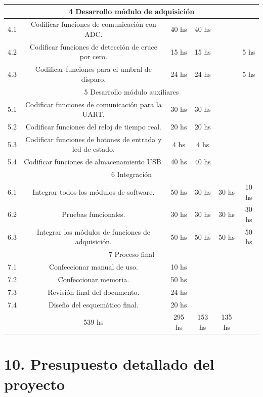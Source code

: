 \documentclass[11pt]{charter}
\begin{document}
\begin{table}[H]
{\begin{tabular}{|c|c|c|c|c|c|}
\multicolumn{6}{|c|}{\cellcolor[HTML]{FFCCCC}4 Desarrollo módulo de adquisición} \\ \hline
4.1 & Codificar funciones de comunicación con ADC. & 40 hs & 40 hs &  &    \\ \hline
4.2 & Codificar funciones de detección de cruce por cero. & 15 hs & 15 hs &  & 5 hs   \\ \hline
4.3 & Codificar funciones para el umbral de disparo. & 24 hs & 24 hs &  &  5 hs  \\ \hline
\multicolumn{6}{|c|}{\cellcolor[HTML]{FFFF99}5 Desarrollo módulo auxiliares} \\ \hline
5.1 & Codificar funciones de comunicación para la UART. & 30 hs & 30 hs &  &    \\ \hline
5.2 & Codificar funciones del reloj de tiempo real. & 20 hs & 20 hs &  &    \\ \hline
5.3 & Codificar funciones de botones de entrada y led de estado. & 4 hs & 4 hs &  &    \\ \hline
5.4 & Codificar funciones de almacenamiento USB. & 40 hs & 40 hs &  &    \\ \hline
\multicolumn{6}{|c|}{\cellcolor[HTML]{B9E0A5}6 Integración} \\ \hline
6.1 & Integrar todos los módulos de software. & 50 hs & 30 hs & 30 hs & 10 hs   \\ \hline
6.2 & Pruebas funcionales. & 30 hs & 30 hs & 30 hs & 30 hs   \\ \hline
6.3 & Integrar los módulos de funciones de adquisición. & 50 hs & 50 hs & 50 hs & 50 hs  \\ \hline
\multicolumn{6}{|c|}{\cellcolor[HTML]{EA6B66}7 Proceso final} \\ \hline
7.1 & Confeccionar manual de uso. & 10 hs &  &  &    \\ \hline
7.2 & Confeccionar memoria. & 50 hs &  &  &    \\ \hline
7.3 & Revisión final del documento. & 24 hs &  &  &    \\ \hline
7.4 & Diseño del esquemático final. & 20 hs &  &  &    \\ \hline  
\rowcolor[HTML]{C0C0C0} 
\multicolumn{2}{|c|}{\cellcolor[HTML]{C0C0C0} Totales} & 539 hs & 295 hs & 153 hs & 135 hs    \\ \hline
\end{tabular}%
}
\end{table}

\section{10. Presupuesto detallado del proyecto}
\label{sec:presupuesto}
\end{document}
